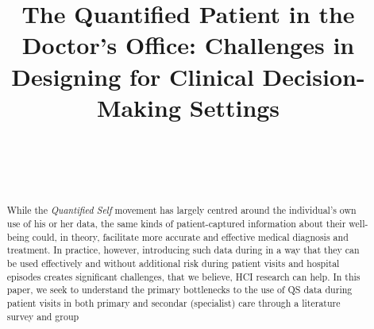 \documentclass{sigchi}
\begin{document}
\title{The Quantified Patient in the Doctor's Office: Challenges in Designing for Clinical Decision-Making Settings}

\author{%
  \\
  \\
  \\
}


\maketitle

\begin{abstract}
While the \emph{Quantified Self} movement has largely centred around the individual’s own use of his or her data, the same kinds of patient-captured information about their well-being could, in theory, facilitate more accurate and effective medical diagnosis and treatment.  In practice, however, introducing such data during in a way that they can be used effectively and without additional risk during patient visits and hospital episodes creates significant challenges, that we believe, HCI research can help.  In this paper, we seek to understand the primary bottlenecks to the use of QS data during patient visits in both primary and secondar (specialist) care through a literature survey and group 

\end{abstract}
\end{document}
